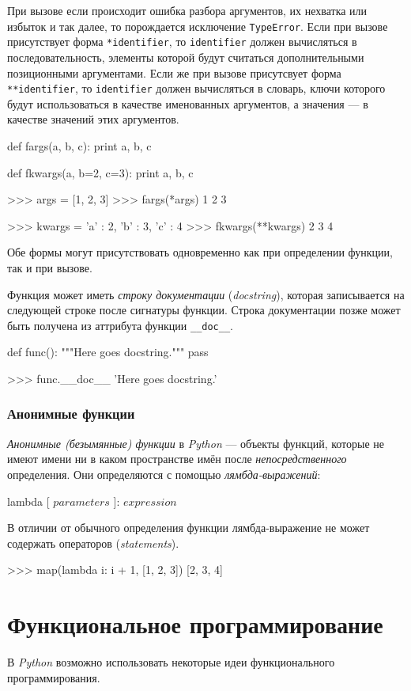 При вызове если происходит ошибка разбора аргументов, их нехватка или избыток и так далее, то порождается исключение \lstinline{TypeError}. Если при вызове присутствует форма \lstinline{*identifier}, то \lstinline{identifier} должен вычисляться в последовательность, элементы которой будут считаться дополнительными позиционными аргументами. Если же при вызове присутсвует форма \lstinline{**identifier}, то \lstinline{identifier} должен вычисляться в словарь, ключи которого будут использоваться в качестве именованных аргументов, а значения — в качестве значений этих аргументов.
\begin{pylst}{}{}
def fargs(a, b, c):
    print a, b, c

def fkwargs(a, b=2, c=3):
    print a, b, c

>>> args = [1, 2, 3]
>>> fargs(*args)
1 2 3

>>> kwargs = { 'a' : 2, 'b' : 3, 'c' : 4 }
>>> fkwargs(**kwargs)
2 3 4
\end{pylst}

Обе формы могут присутствовать одновременно как при определении функции, так и при вызове.

Функция может иметь \emph{строку документации} (\emph{docstring}), которая записывается на следующей строке после сигнатуры функции. Строка документации позже может быть получена из аттрибута функции \lstinline{__doc__}.
\begin{pylst}{}{}
def func():
   """Here goes docstring."""
   pass

>>> func.__doc__
'Here goes docstring.'
\end{pylst}

\subsubsection{Анонимные функции}
\emph{Анонимные (безымянные) функции} в \emph{Python} — объекты функций, которые не имеют имени ни в каком пространстве имён после \emph{непосредственного} определения. Они определяются с помощью \emph{лямбда-выражений}:
\begin{pylst}{}{}
lambda [ $parameters$ ]: $expression$
\end{pylst}

В отличии от обычного определения функции лямбда-выражение не может содержать операторов (\emph{statements}).
\begin{pylst}{}{}
>>> map(lambda i: i + 1, [1, 2, 3])
[2, 3, 4]
\end{pylst}

\section{Функциональное программирование}
В \emph{Python} возможно использовать некоторые идеи функционального программирования.

